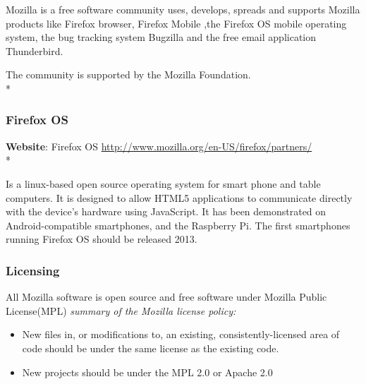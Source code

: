 \documentclass[11pt]{article} %
\begin{document}
Mozilla is a free software community uses, develops, spreads and supports Mozilla products like Firefox browser, Firefox Mobile ,the Firefox OS mobile operating system, the bug tracking system Bugzilla and the free email application Thunderbird.

The community is supported by the Mozilla Foundation.\\*

\subsubsection{Firefox OS}

\textbf{Website}: Firefox OS  \url {http://www.mozilla.org/en-US/firefox/partners/}\\*

Is a linux-based open source operating system for smart phone and table computers. 
It is designed to allow HTML5 applications to communicate directly with the device's hardware using JavaScript. It has been demonstrated on Android-compatible smartphones, and the Raspberry Pi.
The first smartphones running Firefox OS should be released 2013.\\
\subsubsection{Licensing}
All Mozilla software is open source and free software under Mozilla Public License(MPL)
{\it summary of the Mozilla license policy:}
\begin{itemize}
\item New files in, or modifications to, an existing, consistently-licensed area of code should be under the same license as the existing code.
\item New projects should be under the MPL 2.0 or Apache 2.0 
\end{itemize}
\end{document}

